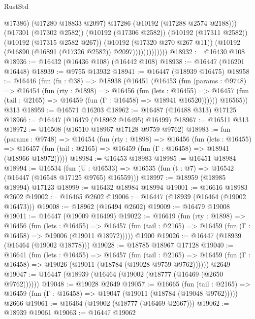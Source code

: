 \begin{lexlean}{RustStd}
\begin{coremodule}
                              @17386)
                            (@17280 @18833 @2097)
                            @17286
                            (@10192 (@17288 @2574 @2188)))
                          (@17301 (@17302 @2582))
                          (@10192 (@17306 @2582))
                          (@10192 (@17311 @2582))
                          (@10192 (@17315 @2582 @267))
                          (@10192 (@17320 @270 @267 @11))
                          (@10192 (@16890 (@16891 (@17326 @2582)) @2097)))))))))))))
@18932 := @16430 @108
@18936 := @16432 (@16436 @108) (@16442 @108)
@18938 := @16447 (@16201 @16448)
@18939 := @9755 @13932
@18941 := @16447 (@18939 @16475)
@18958 := @16446
    (fun (fn : @38) =>
    @18938
      (@16451
        (@16453
          (fun (params : @9748) =>
          @16454
            (fun (rty : @1898) =>
            @16456
              (fun (lets : @16455) =>
              @16457 (fun (tail : @2165) => @16459 (fun (Γ : @16458) => @18941 @16520))))))
        @16565))
    @313
@18959 := @16571 @16203
@18962 := @16487 (@16488 @313) @17125
@18966 := @16447 (@16479 (@18962 @16495) @16499)
@18967 := @16511 @313
@18972 := @16508 (@16510 @18967 @17128 @9759 @9762)
@18983 := fun (params : @9748) =>
  @16454
    (fun (rty : @1898) =>
    @16456
      (fun (lets : @16455) =>
      @16457 (fun (tail : @2165) => @16459 (fun (Γ : @16458) => @18941 (@18966 @18972)))))
@18984 := @16453 @18983
@18985 := @16451 @18984
@18994 := @16534
    (fun (U : @16533) => @16535 (fun (t : @7) => @16542 (@16447 (@16548 @17125 @9765) @16559)))
@18997 := @18959 (@18985 @18994) @17123
@18999 := @16432 @18984 @18994
@19001 := @16616 @18983 @2602
@19002 := @16465 @2602
@19006 := @16447 (@18939 (@16464 (@19002 @16473)))
@19008 := @18962 (@16494 @2602)
@19009 := @16479 @19008
@19011 := @16447 (@19009 @16499)
@19022 := @16619
    (fun (rty : @1898) =>
    @16456
      (fun (lets : @16455) =>
      @16457 (fun (tail : @2165) => @16459 (fun (Γ : @16458) => @19006 (@19011 @18972)))))
    @1900
@19026 := @16447 (@18939 (@16464 (@19002 @18778)))
@19028 := @18785 @18967 @17128
@19040 := @16641
    (fun (lets : @16455) =>
    @16457
      (fun (tail : @2165) =>
      @16459 (fun (Γ : @16458) => @19026 (@19011 (@18784 (@19028 @9759 @9762))))))
    @2649
@19047 := @16447 (@18939 (@16464 (@19002 (@18777 (@16469 (@2650 @9762))))))
@19048 := @19028 @2649
@19057 := @16665
    (fun (tail : @2165) => @16459 (fun (Γ : @16458) => @19047 (@19011 (@18784 (@19048 @9762)))))
    @2666
@19061 := @16464 (@19002 (@18777 (@16469 @2667)))
@19062 := @18939 @19061
@19063 := @16447 @19062

\end{coremodule}
\end{lexlean}
